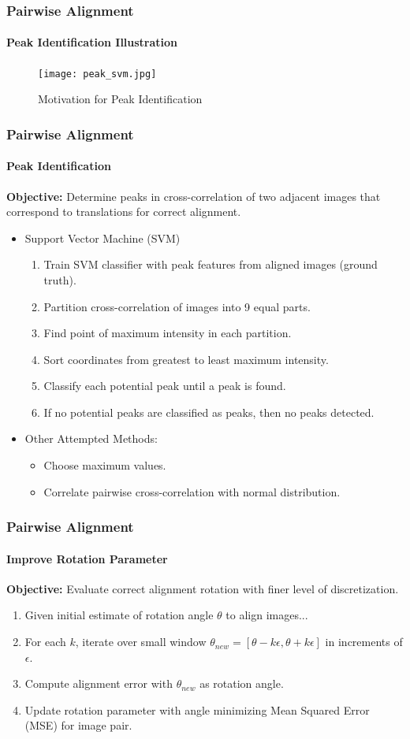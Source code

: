 \documentclass{beamer}
\begin{document}
\begin{frame}
\frametitle{Pairwise Alignment}
\framesubtitle{Peak Identification Illustration}
\begin{figure}[p]
	\centering
	\texttt{[image: peak\_svm.jpg]}
	\caption{Motivation for Peak Identification}
	\label{fig:Peak ID}
\end{figure}
\end{frame}

\begin{frame}
\frametitle{Pairwise Alignment}
\framesubtitle{Peak Identification}
\textbf{Objective:} Determine peaks in cross-correlation of two adjacent images that correspond to translations for correct alignment. \\
\begin{itemize}
\item Support Vector Machine (SVM)
\begin{enumerate}
\item Train SVM classifier with peak features from aligned images (ground truth).
\item Partition cross-correlation of images into 9 equal parts.
\item Find point of maximum intensity in each partition.
\item Sort coordinates from greatest to least maximum intensity.
\item Classify each potential peak until a peak is found.
\item If no potential peaks are classified as peaks, then no peaks detected.
\end{enumerate}
\item Other Attempted Methods:
\begin{itemize}
\item Choose maximum values.
\item Correlate pairwise cross-correlation with normal distribution. 
\end{itemize}
\end{itemize}
\end{frame}

\begin{frame}
\frametitle{Pairwise Alignment}
\framesubtitle{Improve Rotation Parameter} 
\textbf{Objective:} Evaluate correct alignment rotation with finer level of discretization. 
\begin{enumerate}
\item Given initial estimate of rotation angle $\theta$ to align images...
\item For each $k$, iterate over small window $\theta_{new} = [\theta-k\epsilon, \theta+k\epsilon]$ in increments of $\epsilon$.
\item Compute alignment error with $\theta_{new}$ as rotation angle.
\item Update rotation parameter with angle minimizing Mean Squared Error (MSE) for image pair.
\end{enumerate}
\end{frame}
\end{document}

